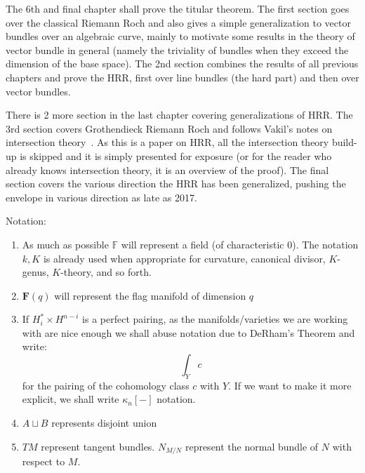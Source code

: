 \documentclass{book}
\newcommand{\F}{{\mathbb{F}}}
\newcommand{\dcup}{\sqcup}
\begin{document}
The 6th and final chapter shall prove the titular theorem. The first section goes over the classical Riemann
Roch and also gives a simple generalization to vector bundles over an algebraic curve, mainly to motivate some
results in the theory of vector bundle in general (namely the triviality of bundles when they exceed the
dimension of the base space). The 2nd section combines the results of all previous chapters and prove the HRR,
first over line bundles (the hard part) and then over vector bundles.

There is 2 more section in the last chapter covering generalizations of HRR. The 3rd section covers
Grothendieck Riemann Roch and follows Vakil's notes on intersection theory~\cite{vakilIntersectionTheory}. As
this is a paper on HRR, all the intersection theory build-up is skipped and it is simply presented for exposure
(or for the reader who already knows intersection theory, it is an overview of the proof). The final section
covers the various direction the HRR has been generalized, pushing the envelope in various direction as late
as 2017.

%
%

Notation:
\begin{enumerate}
  \item As much as possible $\F$ will represent a field (of characteristic $0$). The notation $k, K$ is
    already used when appropriate for curvature, canonical divisor, $K$-genus, $K$-theory, and so forth.
  \item $\mathbf{F}(q)$ will represent the flag manifold of dimension $q$
  \item If $H_i^* \times H^{n-i}$ is a perfect pairing, as the manifolds/varieties we are working with are
    nice enough we shall abuse notation due to DeRham's Theorem and write:
    \[
      \int_Y c
    \]
    for the pairing of the cohomology class $c$ with $Y$. If we want to make it more explicit, we shall write
    $\kappa_n[-]$ notation.
   \item $A\dcup B$ represents disjoint union
   \item $TM$ represent tangent bundles. $N_{M/N}$ represent the normal bundle of $N$ with respect
     to $M$.
\end{enumerate}
\end{document}
